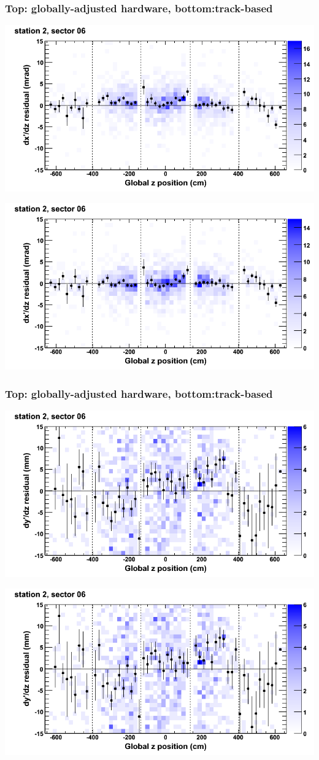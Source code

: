 \documentclass[compress]{beamer}
\begin{document}
\begin{frame}
\frametitle{Top: globally-adjusted hardware, bottom:track-based}
\includegraphics[width=0.7\linewidth]{NOV4_mapplots_HW/DTvsz_st2sec06_dxdz.png}

\includegraphics[width=0.7\linewidth]{NOV4_mapplots/DTvsz_st2sec06_dxdz.png}
\end{frame}

\begin{frame}
\frametitle{Top: globally-adjusted hardware, bottom:track-based}
\includegraphics[width=0.7\linewidth]{NOV4_mapplots_HW/DTvsz_st2sec06_dydz.png}

\includegraphics[width=0.7\linewidth]{NOV4_mapplots/DTvsz_st2sec06_dydz.png}
\end{frame}
\end{document}
